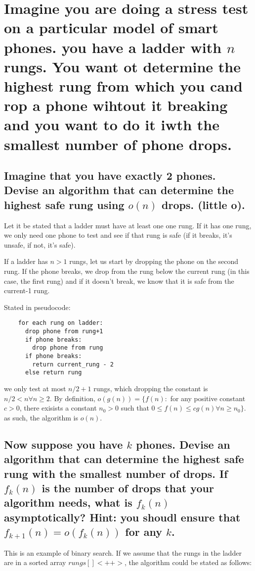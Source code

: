 \documentclass[titlepage]{article}\usepackage[]{graphicx}\usepackage[]{color}
\begin{document}
\section{
  Imagine you are doing a stress test on a particular model of smart phones. you
  have a ladder with $n$ rungs. You want ot determine the highest rung from which
  you cand rop a phone wihtout it breaking and you want to do it iwth the
smallest number of phone drops. }

\subsection{ Imagine that you have exactly 2 phones. Devise an algorithm that
  can determine
the highest safe rung using $o(n)$ drops. (little o). }

  Let it be stated that a ladder must have at least one one rung. If it has
  one rung, we only need one phone to test and see if that rung is safe (if it
  breaks, it's unsafe, if not, it's safe).

  If a ladder has $n > 1$ rungs, let us start by dropping the phone on the
  second rung. If the phone breaks, we drop from the rung below the current
  rung (in this case, the first rung) and if it doesn't break, we know that it
  is safe from the current-1 rung.

  Stated in pseudocode:
  \begin{lstlisting}
	for each rung on ladder:
	  drop phone from rung+1
	  if phone breaks:
		drop phone from rung
	  if phone breaks:
		return current_rung - 2
	  else return rung
  \end{lstlisting}
  we only test at most $n/2+1$ rungs, which dropping the constant is $ n/2 < n
  \forall n \geq 2$. 
  By definition, $o(g(n)) = \{ f(n) : $ for any positive constant $c>0$, there
  exisists a constant $n_0 > 0$ such that $0 \leq f(n) \leq cg(n) \forall n \geq n_0\}$.
  as such, the algorithm is $o(n)$. 

\subsection{Now suppose you have $k$ phones. Devise an algorithm that can
  determine the highest safe rung with the smallest number of drops. If
  $f_k(n)$
  is the number of drops that your algorithm needs, what is 
  $f_k(n)$ asymptotically? Hint: you shoudl ensure that 
  $f_{k+1}(n) = o(f_k(n))$ for any $k$.}

  This is an example of binary search. If we assume that the rungs in the
  ladder are in a sorted array $rungs[]<++>$, the algorithm could be stated
  as follows:
\end{document}

